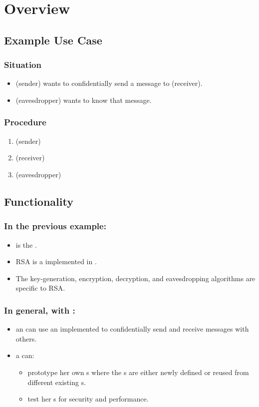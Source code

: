 \section{Overview}

\frame{\sectionpage}


\subsection{Example Use Case}

\begin{frame}
\frametitle{Situation}
\begin{itemize}
\item
  \alice{} (sender) wants to confidentially send a message
  to \bob{} (receiver).
\item
  \eve{} (eavesdropper) wants to know that message.
\end{itemize}
\end{frame}

\begin{frame}
\frametitle{Procedure}
\begin{enumerate}
\item
  \alice{} (sender) \encryptex
\item
  \bob{} (receiver) \decryptex
\item
  \eve{} (eavesdropper) \eavesdropex
\end{enumerate}
\end{frame}


\subsection{Functionality}

\begin{frame}
\frametitle{In the previous example:}
\begin{itemize}
\item
  \cry{} is the \cf.
\item
  RSA is a \cs{} implemented in \cry.
\item
  The key-generation, encryption, decryption,
  and eavesdropping algorithms are specific to RSA.
\end{itemize}
\end{frame}

\begin{frame}
\frametitle{In general, with \cry:}
\begin{itemize}
\item an \eu{} can use an implemented \cs{}
  to confidentially send and receive messages with others.
\item a \cg{} can:
  \begin{itemize}
  \item prototype her own \cs s
    where the \ca s are either newly defined
    or reused from different existing \cs s.
  \item test her \cs s for security and performance.
  \end{itemize}
\end{itemize}
\end{frame}
